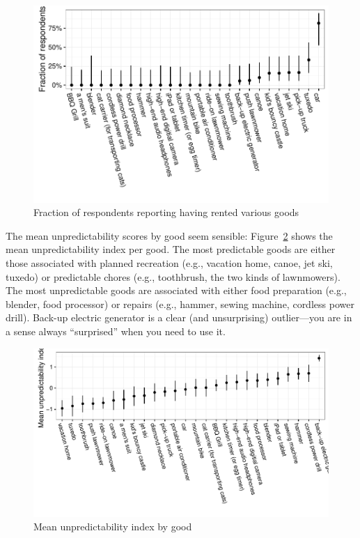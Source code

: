 \documentclass[12pt]{article}
\begin{document}
\begin{figure}
\centering 
\caption{Fraction of respondents reporting having rented various goods \label{fig:frac_renting}}
\begin{minipage}{0.90 \linewidth}
\includegraphics[width = \linewidth]{./plots/rental_fractions.pdf} 
\end{minipage} 
\end{figure} 

The mean unpredictability scores by good seem sensible: 
Figure~\ref{fig:predict_index} shows the mean unpredictability index per good. 
The most predictable goods are either those associated with planned recreation (e.g., vacation home, canoe, jet ski, tuxedo) or predictable chores (e.g., toothbrush, the two kinds of lawnmowers). 
The most unpredictable goods are associated with either food preparation (e.g., blender, food processor) or repairs (e.g., hammer, sewing machine, cordless power drill). 
Back-up electric generator is a clear (and unsurprising) outlier---you are in a sense always ``surprised'' when you need to use it. 


\begin{figure}
\centering 
\caption{Mean unpredictability index by good \label{fig:predict_index} }
\begin{minipage}{0.90 \linewidth}
\includegraphics[width = \linewidth]{./plots/predictability.pdf} 
\end{minipage} 
\end{figure} 
\end{document}
